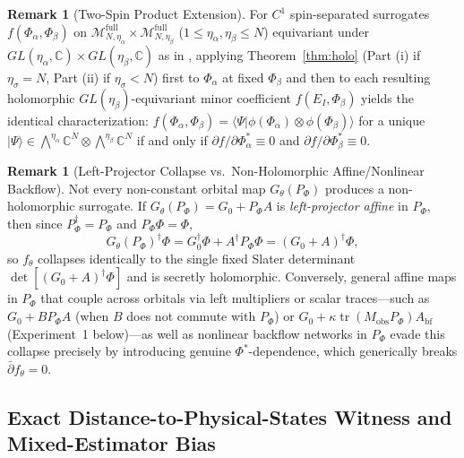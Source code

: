\documentclass[11pt,a4paper]{article}
\theoremstyle{definition}
\newtheorem{remark}[theorem]{Remark}
\DeclareMathOperator{\tr}{tr}
\newcommand{\C}{\mathbb{C}}
\newcommand{\ket}[1]{\lvert #1 \rangle}
\newcommand{\braket}[2]{\langle #1 \vert #2 \rangle}
\begin{document}
\begin{remark}[Two-Spin Product Extension]
For $C^1$ spin-separated surrogates $f(\Phi_\alpha, \Phi_\beta)$ on $\mathcal{M}_{N,\eta_\alpha}^{\mathrm{full}} \times \mathcal{M}_{N,\eta_\beta}^{\mathrm{full}}$ ($1 \le \eta_\alpha, \eta_\beta \le N$) equivariant under $GL(\eta_\alpha,\C)\times GL(\eta_\beta,\C)$ as in \cite[Eq.~(S2.19)]{jiang2026machine}, applying Theorem~\ref{thm:holo} (Part (i) if $\eta_\sigma = N$, Part (ii) if $\eta_\sigma < N$) first to $\Phi_\alpha$ at fixed $\Phi_\beta$ and then to each resulting holomorphic $GL(\eta_\beta)$-equivariant minor coefficient $f(E_I, \Phi_\beta)$ yields the identical characterization: $f(\Phi_\alpha,\Phi_\beta) = \braket{\Psi}{\phi(\Phi_\alpha)\otimes\phi(\Phi_\beta)}$ for a unique $\ket{\Psi} \in \bigwedge^{\eta_\alpha}\C^N \otimes \bigwedge^{\eta_\beta}\C^N$ if and only if $\partial f / \partial \Phi_\alpha^* \equiv 0$ and $\partial f / \partial \Phi_\beta^* \equiv 0$.
\end{remark}

\begin{remark}[Left-Projector Collapse vs.\ Non-Holomorphic Affine/Nonlinear Backflow]\label{rem:collapse}
Not every non-constant orbital map $G_\theta(P_\Phi)$ produces a non-holomorphic surrogate. If $G_\theta(P_\Phi) = G_0 + P_\Phi A$ is \emph{left-projector affine} in $P_\Phi$, then since $P_\Phi^\dagger = P_\Phi$ and $P_\Phi \Phi = \Phi$,
\[
  G_\theta(P_\Phi)^\dagger \Phi = G_0^\dagger \Phi + A^\dagger P_\Phi \Phi = (G_0 + A)^\dagger \Phi,
\]
so $f_\theta$ collapses identically to the single fixed Slater determinant $\det[(G_0 + A)^\dagger \Phi]$ and is secretly holomorphic. Conversely, general affine maps in $P_\Phi$ that couple across orbitals via left multipliers or scalar traces---such as $G_0 + B P_\Phi A$ (when $B$ does not commute with $P_\Phi$) or $G_0 + \kappa \tr(M_{\mathrm{obs}} P_\Phi) A_{\mathrm{bf}}$ (Experiment~1 below)---as well as nonlinear backflow networks in $P_\Phi$ evade this collapse precisely by introducing genuine $\Phi^*$-dependence, which generically breaks $\bar{\partial} f_\theta = 0$.
\end{remark}

\subsection{Exact Distance-to-Physical-States Witness and Mixed-Estimator Bias}
\end{document}
